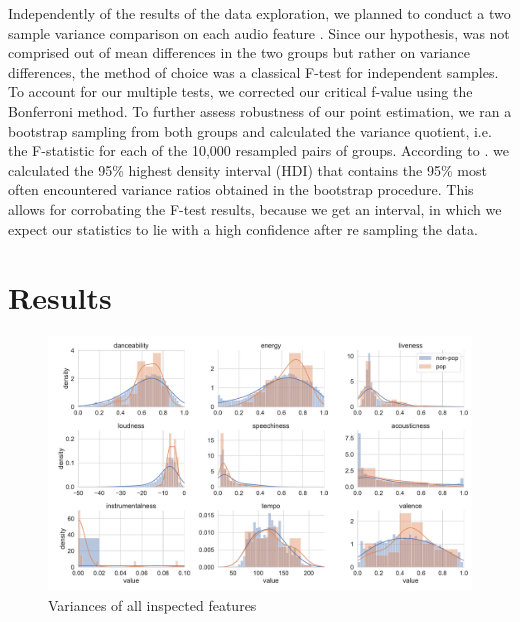 \documentclass{article}
\begin{document}
Independently of the results of the data exploration, we planned to conduct a two sample variance comparison on each audio feature \citep{snedecor1989}. Since our hypothesis, was not comprised out of mean differences in the two groups but rather on variance differences, the method of choice was a classical F-test for independent samples. To account for our multiple tests, we corrected our critical f-value using the Bonferroni method. To further assess robustness of our point estimation, we ran a bootstrap sampling from both groups and calculated the variance quotient, i.e. the F-statistic for each of the 10,000 resampled pairs of groups. According to \cite{kruschke2014}.
we calculated the 95\% highest density interval (HDI) that contains the 95\%  most often encountered variance ratios obtained in the bootstrap procedure. This allows for corrobating the F-test results, because we get an interval, in which we expect our statistics to lie with a high confidence after re sampling the data.

\section{Results}

\begin{figure}
  \centering
  \includegraphics[width=1\linewidth]{../fig/002_variances.pdf}
  \vspace*{-8mm}
  \caption{Variances of all inspected features}
\end{figure}
\end{document}

